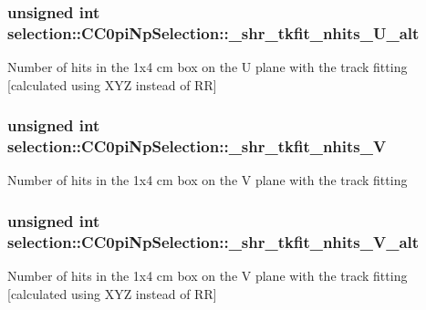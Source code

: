 \subsubsection[{\texorpdfstring{\+\_\+shr\+\_\+tkfit\+\_\+nhits\+\_\+\+U\+\_\+alt}{_shr_tkfit_nhits_U_alt}}]{\setlength{\rightskip}{0pt plus 5cm}unsigned int selection\+::\+C\+C0pi\+Np\+Selection\+::\+\_\+shr\+\_\+tkfit\+\_\+nhits\+\_\+\+U\+\_\+alt\hspace{0.3cm}{\ttfamily [private]}}\hypertarget{classselection_1_1CC0piNpSelection_a2a432bd36ae5dc824470183ca6621218}{}\label{classselection_1_1CC0piNpSelection_a2a432bd36ae5dc824470183ca6621218}
Number of hits in the 1x4 cm box on the U plane with the track fitting \mbox{[}calculated using X\+YZ instead of RR\mbox{]} 
\subsubsection[{\texorpdfstring{\+\_\+shr\+\_\+tkfit\+\_\+nhits\+\_\+V}{_shr_tkfit_nhits_V}}]{\setlength{\rightskip}{0pt plus 5cm}unsigned int selection\+::\+C\+C0pi\+Np\+Selection\+::\+\_\+shr\+\_\+tkfit\+\_\+nhits\+\_\+V\hspace{0.3cm}{\ttfamily [private]}}\hypertarget{classselection_1_1CC0piNpSelection_adab23c54dd799cdf83c31a10e4ae9061}{}\label{classselection_1_1CC0piNpSelection_adab23c54dd799cdf83c31a10e4ae9061}
Number of hits in the 1x4 cm box on the V plane with the track fitting 
\subsubsection[{\texorpdfstring{\+\_\+shr\+\_\+tkfit\+\_\+nhits\+\_\+\+V\+\_\+alt}{_shr_tkfit_nhits_V_alt}}]{\setlength{\rightskip}{0pt plus 5cm}unsigned int selection\+::\+C\+C0pi\+Np\+Selection\+::\+\_\+shr\+\_\+tkfit\+\_\+nhits\+\_\+\+V\+\_\+alt\hspace{0.3cm}{\ttfamily [private]}}\hypertarget{classselection_1_1CC0piNpSelection_abd57bba0cf3b1c9268afc03e8713df13}{}\label{classselection_1_1CC0piNpSelection_abd57bba0cf3b1c9268afc03e8713df13}
Number of hits in the 1x4 cm box on the V plane with the track fitting \mbox{[}calculated using X\+YZ instead of RR\mbox{]} 
